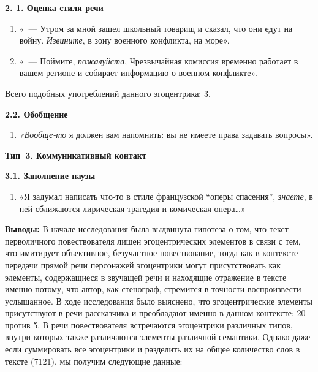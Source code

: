\documentclass{kursa4}
\begin{document}
    \textbf{2. 1. Оценка стиля речи}

    \setcounter{saveenum}{\value{enumi}}
    \begin{enumerate}
    \setcounter{enumi}{\value{saveenum}}
    \item «~--- Утром за мной зашел школьный товарищ и сказал, что они едут на
    войну. \textit{Извините}, в зону военного конфликта, на море». 
    \item «~--- Поймите, \textit{пожалуйста}, Чрезвычайная комиссия временно
    работает в вашем регионе и собирает информацию о военном конфликте».
    \end{enumerate}
    Всего подобных употреблений данного эгоцентрика: 3.

    \textbf{2.2. Обобщение}

    \setcounter{saveenum}{\value{enumi}}
    \begin{enumerate}
    \setcounter{enumi}{\value{saveenum}}
    \item \textit{«Вообще-то} я должен вам напомнить: вы не имеете права
    задавать вопросы».
    \end{enumerate}
    {\centering
    \textbf{Тип~3. Коммуникативный контакт }
    \par}

    \textbf{3.1. Заполнение паузы}

    \setcounter{saveenum}{\value{enumi}}
    \begin{enumerate}
    \setcounter{enumi}{\value{saveenum}}
    \item «Я задумал написать что-то в стиле французской “оперы спасения”,
    \textit{знаете}, в ней сближаются лирическая трагедия и комическая
    опера…»
    \end{enumerate}

    \bigskip

    {}\textbf{{Выводы:}}{
    В начале исследования была выдвинута гипотеза о том, что текст
    перволичного повествователя лишен эгоцентрических элементов в связи с
    тем, что имитирует объективное, безучастное повествование, тогда как в
    контексте передачи прямой речи персонажей эгоцентрики могут
    присутствовать как элементы, содержащиеся в звучащей речи и находящие
    отражение в тексте именно потому, что автор, как стенограф, стремится в
    точности воспроизвести услышанное. В ходе исследования было выяснено,
    что эгоцентрические элементы присутствуют в речи рассказчика и
    преобладают именно в данном контексте: 20 против 5. В речи
    повествователя встречаются эгоцентрики различных типов, внутри
    которых также различаются элементы различной семантики. Однако даже
    если суммировать все эгоцентрики и разделить их на общее количество
    слов в тексте (7121), мы получим следующие данные:}
\end{document}
